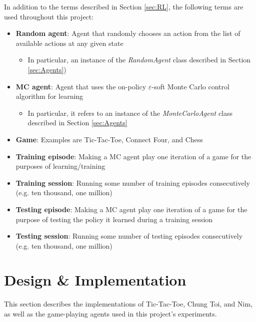 \documentclass[11pt,a4paper]{report}
\begin{document}
In addition to the terms described in Section \ref{sec:RL}, the following terms are used throughout this project:

\begin{itemize}

	\item \textbf{Random agent}: Agent that randomly chooses an action from the list of available actions at any given state
		\begin{itemize}
			\item In particular, an instance of the \emph{RandomAgent} class described in Section \ref{sec:Agents})
		\end{itemize}

	\item \textbf{MC agent}: Agent that uses the on-policy $\varepsilon$-soft Monte Carlo control algorithm for learning
		\begin{itemize}
			\item In particular, it refers to an instance of the \emph{MonteCarloAgent} class described in Section \ref{sec:Agents}
		\end{itemize}

	\item \textbf{Game}: Examples are Tic-Tac-Toe, Connect Four, and Chess

	\item \textbf{Training episode}: Making a MC agent play one iteration of a game for the purposes of learning/training

	\item \textbf{Training session}: Running some number of training episodes consecutively (e.g. ten thousand, one million)

	\item \textbf{Testing episode}: Making a MC agent play one iteration of a game for the purpose of testing the policy it learned during a training session

	\item \textbf{Testing session}: Running some number of testing episodes consecutively (e.g. ten thousand, one million)

\end{itemize}


\chapter{Design \& Implementation}
\label{sec:DesignImpl}

This section describes the implementations of Tic-Tac-Toe, Chung Toi, and Nim, as well as the game-playing agents used in this project's experiments.
\end{document}
